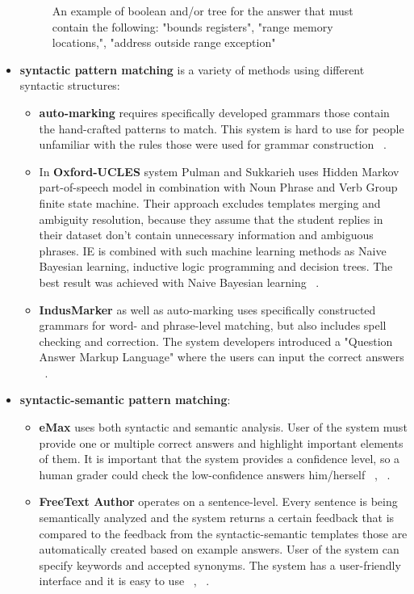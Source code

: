 \begin{itemize}
\begin{figure}[h!]
    \caption{ An example of boolean and/or tree for the answer that must contain the following: "bounds registers", "range memory locations,", "address outside range exception" ~\cite{Thomas} }\label{fig:AndOr}
\end{figure}
\item \textbf{syntactic pattern matching} is a variety of methods using different syntactic structures:
\begin{itemize}
\item \textbf{auto-marking} requires specifically developed grammars those contain the hand-crafted patterns to match. This system is hard to use for people unfamiliar with the rules those were used for grammar construction ~\cite{Hasanah}.
\item In \textbf{Oxford-UCLES} system Pulman and Sukkarieh uses Hidden Markov part-of-speech model in combination with Noun Phrase and Verb Group finite state machine. Their approach excludes templates merging and ambiguity resolution, because they assume that the student replies in their dataset don't contain unnecessary information and ambiguous phrases. IE is combined with such machine learning methods as Naive Bayesian learning, inductive logic programming and decision trees. The best result was achieved with Naive Bayesian learning ~\cite{Pulman}.
\item \textbf{IndusMarker} as well as auto-marking uses specifically constructed grammars for word- and phrase-level matching, but also includes spell checking and correction. The system developers introduced a "Question Answer Markup Language" where the users can input the correct answers ~\cite{Burrows}.
\end{itemize}
\item \textbf{syntactic-semantic pattern matching}:
\begin{itemize}
\item \textbf{eMax} uses both syntactic and semantic analysis. User of the system must provide one or multiple correct answers and highlight important elements of them. It is important that the system provides a confidence level, so a human grader could check the low-confidence answers him/herself ~\cite{Burrows}, ~\cite{Hasanah}.
\item \textbf{FreeText Author} operates on a sentence-level. Every sentence is being semantically analyzed and the system returns a certain feedback that is compared to the feedback from the syntactic-semantic templates those are automatically created based on example answers. User of the system can specify keywords and accepted synonyms. The system has a user-friendly interface and it is easy to use ~\cite{Burrows}, ~\cite{Hasanah}.

\end{itemize}
\end{itemize}
